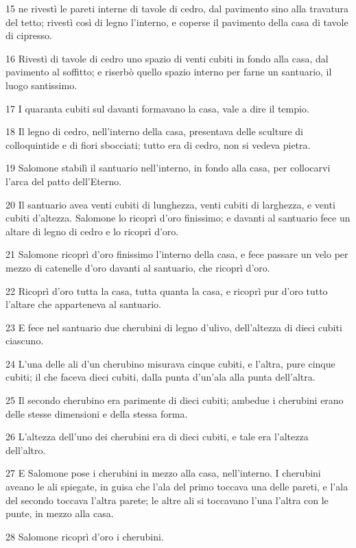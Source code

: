 \par 15 ne rivestì le pareti interne di tavole di cedro, dal pavimento sino alla travatura del tetto; rivestì così di legno l'interno, e coperse il pavimento della casa di tavole di cipresso.
\par 16 Rivestì di tavole di cedro uno spazio di venti cubiti in fondo alla casa, dal pavimento al soffitto; e riserbò quello spazio interno per farne un santuario, il luogo santissimo.
\par 17 I quaranta cubiti sul davanti formavano la casa, vale a dire il tempio.
\par 18 Il legno di cedro, nell'interno della casa, presentava delle sculture di colloquintide e di fiori sbocciati; tutto era di cedro, non si vedeva pietra.
\par 19 Salomone stabilì il santuario nell'interno, in fondo alla casa, per collocarvi l'arca del patto dell'Eterno.
\par 20 Il santuario avea venti cubiti di lunghezza, venti cubiti di larghezza, e venti cubiti d'altezza. Salomone lo ricoprì d'oro finissimo; e davanti al santuario fece un altare di legno di cedro e lo ricoprì d'oro.
\par 21 Salomone ricoprì d'oro finissimo l'interno della casa, e fece passare un velo per mezzo di catenelle d'oro davanti al santuario, che ricoprì d'oro.
\par 22 Ricoprì d'oro tutta la casa, tutta quanta la casa, e ricoprì pur d'oro tutto l'altare che apparteneva al santuario.
\par 23 E fece nel santuario due cherubini di legno d'ulivo, dell'altezza di dieci cubiti ciascuno.
\par 24 L'una delle ali d'un cherubino misurava cinque cubiti, e l'altra, pure cinque cubiti; il che faceva dieci cubiti, dalla punta d'un'ala alla punta dell'altra.
\par 25 Il secondo cherubino era parimente di dieci cubiti; ambedue i cherubini erano delle stesse dimensioni e della stessa forma.
\par 26 L'altezza dell'uno dei cherubini era di dieci cubiti, e tale era l'altezza dell'altro.
\par 27 E Salomone pose i cherubini in mezzo alla casa, nell'interno. I cherubini aveano le ali spiegate, in guisa che l'ala del primo toccava una delle pareti, e l'ala del secondo toccava l'altra parete; le altre ali si toccavano l'una l'altra con le punte, in mezzo alla casa.
\par 28 Salomone ricoprì d'oro i cherubini.
